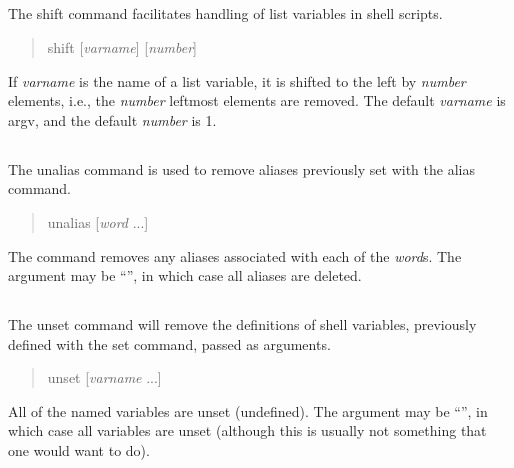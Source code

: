 \subsection{}


The {\cb shift} command facilitates handling of list variables in
shell scripts.
\begin{quote}\vt
shift [{\it varname\/}] [{\it number\/}]
\end{quote}
If {\it varname} is the name of a list variable, it is shifted to
the left by {\it number} elements, i.e., the {\it number} leftmost
elements are removed. The default {\it varname} is {\vt argv}, and
the default {\it number} is 1.

\subsection{}


The {\cb unalias} command is used to remove aliases previously set with
the {\cb alias} command.
\begin{quote}\vt
unalias [{\it word} ...]
\end{quote}
The command removes any aliases associated with each of the {\it
word\/}s.  The argument may be ``{\vt *}'', in which case all aliases
are deleted.

\subsection{}


The {\cb unset} command will remove the definitions of shell
variables, previously defined with the {\cb set} command, passed as
arguments.
\begin{quote}\vt
unset [{\it varname} ...]
\end{quote}
All of the named variables are unset (undefined).  The argument may be
``{\vt *}'', in which case all variables are unset (although this is
usually not something that one would want to do).

\subsection{}

